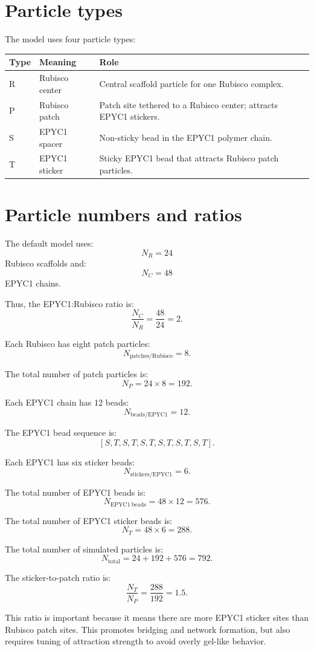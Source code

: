 \documentclass[11pt]{article}
\begin{document}
\section{Particle types}

The model uses four particle types:
\begin{longtable}{>{\ttfamily}p{} p{} p{}}
\toprule
Type & Meaning & Role \\
\midrule
R & Rubisco center & Central scaffold particle for one Rubisco complex. \\
P & Rubisco patch & Patch site tethered to a Rubisco center; attracts EPYC1 stickers. \\
S & EPYC1 spacer & Non-sticky bead in the EPYC1 polymer chain. \\
T & EPYC1 sticker & Sticky EPYC1 bead that attracts Rubisco patch particles. \\
\bottomrule
\end{longtable}

\section{Particle numbers and ratios}

The default model uses:
\[
N_R = 24
\]
Rubisco scaffolds and:
\[
N_C = 48
\]
EPYC1 chains.

Thus, the EPYC1:Rubisco ratio is:
\[
\frac{N_C}{N_R} = \frac{48}{24} = 2.
\]

Each Rubisco has eight patch particles:
\[
N_{\mathrm{patches/Rubisco}} = 8.
\]

The total number of patch particles is:
\[
N_P = 24 \times 8 = 192.
\]

Each EPYC1 chain has 12 beads:
\[
N_{\mathrm{beads/EPYC1}} = 12.
\]

The EPYC1 bead sequence is:
\[
[S,T,S,T,S,T,S,T,S,T,S,T].
\]

Each EPYC1 has six sticker beads:
\[
N_{\mathrm{stickers/EPYC1}} = 6.
\]

The total number of EPYC1 beads is:
\[
N_{\mathrm{EPYC1\ beads}} = 48 \times 12 = 576.
\]

The total number of EPYC1 sticker beads is:
\[
N_T = 48 \times 6 = 288.
\]

The total number of simulated particles is:
\[
N_{\mathrm{total}} = 24 + 192 + 576 = 792.
\]

The sticker-to-patch ratio is:
\[
\frac{N_T}{N_P} = \frac{288}{192} = 1.5.
\]

This ratio is important because it means there are more EPYC1 sticker sites than Rubisco patch sites. This promotes bridging and network formation, but also requires tuning of attraction strength to avoid overly gel-like behavior.
\end{document}

